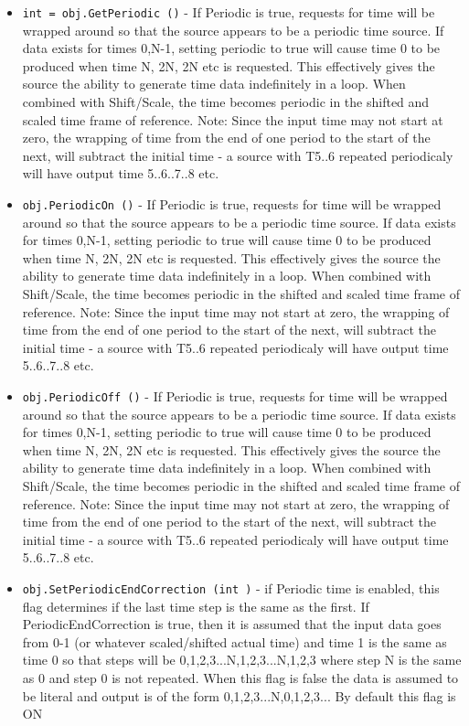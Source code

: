 \begin{itemize}
\item  \verb|int = obj.GetPeriodic ()| -  If Periodic is true, requests for time will be wrapped around so that 
 the source appears to be a periodic time source. If data exists for times
 {0,N-1}, setting periodic to true will cause time 0 to be produced when time
 N, 2N, 2N etc is requested. This effectively gives the source the ability to
 generate time data indefinitely in a loop.
 When combined with Shift/Scale, the time becomes periodic in the 
 shifted and scaled time frame of reference.
 Note: Since the input time may not start at zero, the wrapping of time
 from the end of one period to the start of the next, will subtract the
 initial time - a source with T{5..6} repeated periodicaly will have output
 time {5..6..7..8} etc. 

\item  \verb|obj.PeriodicOn ()| -  If Periodic is true, requests for time will be wrapped around so that 
 the source appears to be a periodic time source. If data exists for times
 {0,N-1}, setting periodic to true will cause time 0 to be produced when time
 N, 2N, 2N etc is requested. This effectively gives the source the ability to
 generate time data indefinitely in a loop.
 When combined with Shift/Scale, the time becomes periodic in the 
 shifted and scaled time frame of reference.
 Note: Since the input time may not start at zero, the wrapping of time
 from the end of one period to the start of the next, will subtract the
 initial time - a source with T{5..6} repeated periodicaly will have output
 time {5..6..7..8} etc. 

\item  \verb|obj.PeriodicOff ()| -  If Periodic is true, requests for time will be wrapped around so that 
 the source appears to be a periodic time source. If data exists for times
 {0,N-1}, setting periodic to true will cause time 0 to be produced when time
 N, 2N, 2N etc is requested. This effectively gives the source the ability to
 generate time data indefinitely in a loop.
 When combined with Shift/Scale, the time becomes periodic in the 
 shifted and scaled time frame of reference.
 Note: Since the input time may not start at zero, the wrapping of time
 from the end of one period to the start of the next, will subtract the
 initial time - a source with T{5..6} repeated periodicaly will have output
 time {5..6..7..8} etc. 

\item  \verb|obj.SetPeriodicEndCorrection (int )| -  if Periodic time is enabled, this flag determines if the last time step is the same
 as the first. If PeriodicEndCorrection is true, then it is assumed that the input
 data goes from 0-1 (or whatever scaled/shifted actual time) and time 1 is the
 same as time 0 so that steps will be 0,1,2,3...N,1,2,3...N,1,2,3 where step N
 is the same as 0 and step 0 is not repeated. When this flag is false
 the data is assumed to be literal and output is of the form 0,1,2,3...N,0,1,2,3...
 By default this flag is ON


\end{itemize}
